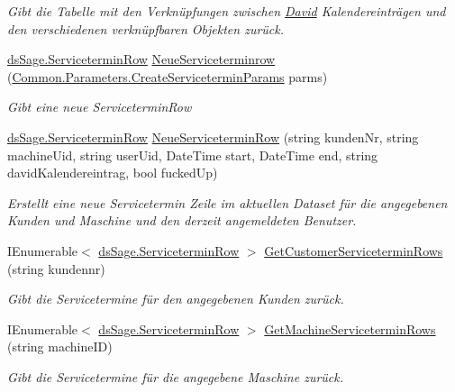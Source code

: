 \begin{DoxyCompactItemize}
\begin{DoxyCompactList}\small\item\em Gibt die Tabelle mit den Verknüpfungen zwischen \hyperlink{namespace_david}{David} Kalendereinträgen und den verschiedenen verknüpfbaren Objekten zurück. \end{DoxyCompactList}\item 
\hyperlink{class_products_1_1_data_1_1ds_sage_1_1_servicetermin_row}{ds\+Sage.\+Servicetermin\+Row} \hyperlink{class_products_1_1_data_1_1_data_service_acdb6021790dfd5388f3ca71deaf86d59}{Neue\+Serviceterminrow} (\hyperlink{class_products_1_1_common_1_1_parameters_1_1_create_servicetermin_params}{Common.\+Parameters.\+Create\+Servicetermin\+Params} parms)
\begin{DoxyCompactList}\small\item\em Gibt eine neue Servicetermin\+Row \end{DoxyCompactList}\item 
\hyperlink{class_products_1_1_data_1_1ds_sage_1_1_servicetermin_row}{ds\+Sage.\+Servicetermin\+Row} \hyperlink{class_products_1_1_data_1_1_data_service_aec1690521ee7d30cde7933c9b884e2b7}{Neue\+Servicetermin\+Row} (string kunden\+Nr, string machine\+Uid, string user\+Uid, Date\+Time start, Date\+Time end, string david\+Kalendereintrag, bool fucked\+Up)
\begin{DoxyCompactList}\small\item\em Erstellt eine neue Servicetermin Zeile im aktuellen Dataset für die angegebenen Kunden und Maschine und den derzeit angemeldeten Benutzer. \end{DoxyCompactList}\item 
I\+Enumerable$<$ \hyperlink{class_products_1_1_data_1_1ds_sage_1_1_servicetermin_row}{ds\+Sage.\+Servicetermin\+Row} $>$ \hyperlink{class_products_1_1_data_1_1_data_service_aef8489daca73b4f51d5381cc8f693cf0}{Get\+Customer\+Servicetermin\+Rows} (string kundennr)
\begin{DoxyCompactList}\small\item\em Gibt die Servicetermine für den angegebenen Kunden zurück. \end{DoxyCompactList}\item 
I\+Enumerable$<$ \hyperlink{class_products_1_1_data_1_1ds_sage_1_1_servicetermin_row}{ds\+Sage.\+Servicetermin\+Row} $>$ \hyperlink{class_products_1_1_data_1_1_data_service_ab06904626bcc305b61e5cfdea90bc696}{Get\+Machine\+Servicetermin\+Rows} (string machine\+ID)
\begin{DoxyCompactList}\small\item\em Gibt die Servicetermine für die angegebene Maschine zurück. \end{DoxyCompactList}\item 

\end{DoxyCompactItemize}
